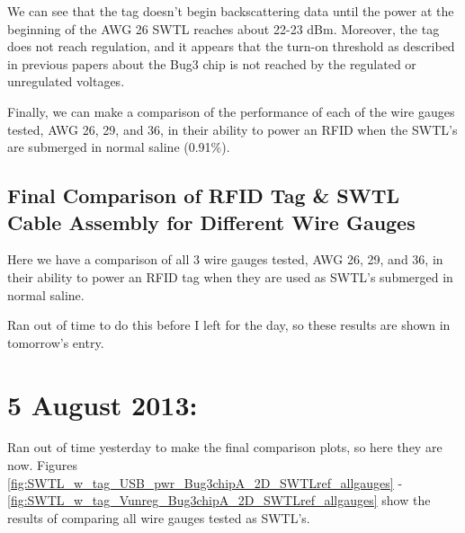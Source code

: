 \documentclass[12pt,onecolumn,titlepage]{article}
\begin{document}
We can see that the tag doesn't begin backscattering data until the power at the beginning of the AWG 26 SWTL reaches about 22-23 dBm. Moreover, the tag does not reach regulation, and it appears that the turn-on threshold as described in previous papers about the Bug3 chip is not reached by the regulated or unregulated voltages. 

Finally, we can make a comparison of the performance of each of the wire gauges tested, AWG 26, 29, and 36, in their ability to power an RFID when the SWTL's are submerged in normal saline (0.91\%). 




\subsection{Final Comparison of RFID Tag \& SWTL Cable Assembly for Different Wire Gauges}
\indent \indent Here we have a comparison of all 3 wire gauges tested, AWG 26, 29, and 36, in their ability to power an RFID tag when they are used as SWTL's submerged in normal saline. 

Ran out of time to do this before I left for the day, so these results are shown in tomorrow's entry. \smiley





\clearpage
\section{5 August 2013:}

\indent \indent Ran out of time yesterday to make the final comparison plots, so here they are now. Figures \ref{fig:SWTL_w_tag_USB_pwr_Bug3chipA_2D_SWTLref_allgauges} - \ref{fig:SWTL_w_tag_Vunreg_Bug3chipA_2D_SWTLref_allgauges} show the results of comparing all wire gauges tested as SWTL's.
\end{document}
